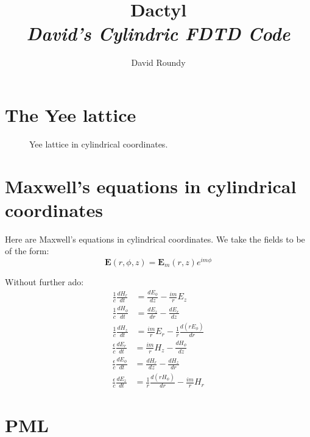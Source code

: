 \documentclass[floats]{report}
\begin{document}
\title{
    Dactyl\\
{\Large \it David's Cylindric FDTD Code}
}
\author{
    David Roundy
}

\maketitle 

\tableofcontents

\chapter{The Yee lattice}

\begin{figure}
\caption{Yee lattice in cylindrical coordinates.
\label{yee_fig}}
\centering
\mbox{}
\vspace{13cm}
\end{figure}

\chapter{Maxwell's equations in cylindrical coordinates}

Here are Maxwell's equations in cylindrical coordinates.  We take the
fields to be of the form:
\begin{equation*}
\mathbf{E}(r,\phi,z) = \mathbf{E}_m(r,z)e^{i m \phi} 
\end{equation*}

Without further ado:
\begin{align}
\frac1c\frac{dH_r}{dt} &= \frac{dE_\phi}{dz} - \frac{im}r E_z\\
\frac1c\frac{dH_\phi}{dt} &= \frac{dE_z}{dr} - \frac{dE_r}{dz}\\
\frac1c\frac{dH_z}{dt} &= \frac{im}r E_r - \frac1r\frac{d(rE_\phi)}{dr}
\end{align}
\begin{align}
\frac\epsilon c\frac{dE_r}{dt} &= \frac{im}r H_z - \frac{dH_\phi}{dz} \\
\frac\epsilon c\frac{dE_\phi}{dt} &= \frac{dH_r}{dz} - \frac{dH_z}{dr} \\
\frac\epsilon c\frac{dE_z}{dt} &= \frac1r\frac{d(rH_\phi)}{dr} - \frac{im}r H_r
\end{align}


\chapter{PML}
\end{document}
